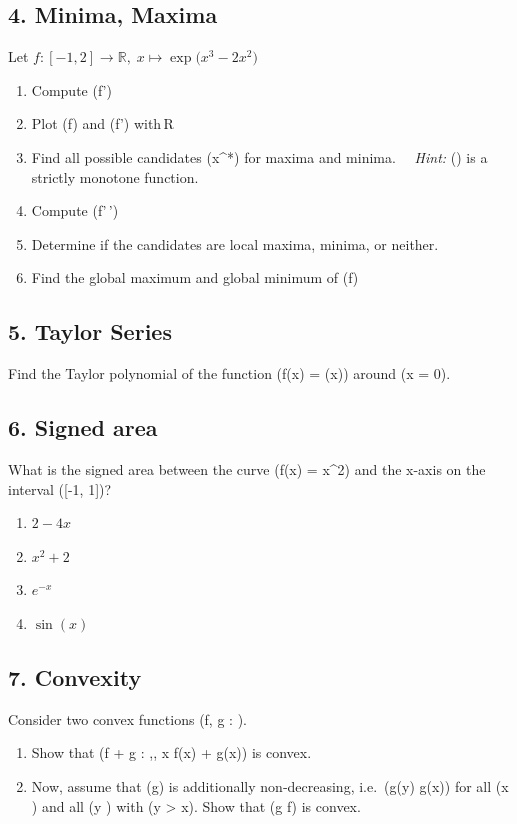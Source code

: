 \documentclass[
  letterpaper,
  DIV=11,
  numbers=noendperiod]{scrartcl}
\providecommand{\tightlist}{%
  \setlength{\itemsep}{0pt}\setlength{\parskip}{0pt}}\usepackage{longtable,booktabs,array}
\begin{document}
\subsection{4. Minima, Maxima}\label{minima-maxima}

Let
\(f : [-1,2] \to \mathbb{R},\; x \mapsto \exp\!\bigl(x^{3}-2x^{2}\bigr)\)

\begin{enumerate}
\def\labelenumi{(\alph{enumi})}
\item
  Compute (f')
\item
  Plot (f) and (f') with\,R
\item
  Find all possible candidates (x\^{}*) for maxima and minima.
   \emph{Hint:} (\exp) is a strictly monotone function.
\item
  Compute (f'\,')
\item
  Determine if the candidates are local maxima, minima, or neither.
\item
  Find the global maximum and global minimum of (f)
\end{enumerate}

\subsection{5. Taylor Series}\label{taylor-series}

Find the Taylor polynomial of the function (f(x) = \sin(x)) around (x =
0).

\subsection{6. Signed area}\label{signed-area}

What is the signed area between the curve (f(x) = x\^{}2) and the x-axis
on the interval ({[}-1, 1{]})?

\begin{enumerate}
\def\labelenumi{\arabic{enumi}.}
\tightlist
\item
  \(2 - 4x\)
\item
  \(x^2 + 2\)
\item
  \(e^{-x}\)
\item
  \(\sin(x)\)
\end{enumerate}

\subsection{7. Convexity}\label{convexity}

Consider two convex functions (f, g :  \to {}).

\begin{enumerate}
\def\labelenumi{(\alph{enumi})}
\item
  Show that (f + g :  \to {},, x \mapsto f(x) + g(x))
  is convex.
\item
  Now, assume that (g) is additionally non‑decreasing, i.e.~(g(y)
  \ge g(x)) for all (x \in {}) and all (y \in {}) with
  (y \textgreater{} x). Show that (g \circ f) is convex.
\end{enumerate}
\end{document}

